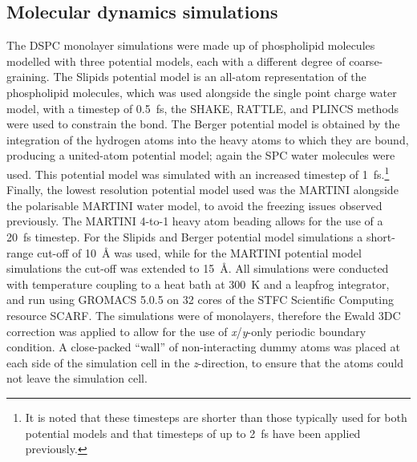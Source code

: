 \subsection{Molecular dynamics simulations}
The DSPC monolayer simulations were made up of phospholipid molecules modelled with three potential models, each with a different degree of coarse-graining.
The Slipids potential model is an all-atom representation of the phospholipid molecules, which was used alongside the single point charge water model, with a timestep of \SI{0.5}{\femto\second}, the SHAKE, RATTLE, and PLINCS methods were used to constrain the  bond.
The Berger potential model is obtained by the integration of the hydrogen atoms into the heavy atoms to which they are bound, producing a united-atom potential model; again the SPC water molecules were used.
This potential model was simulated with an increased timestep of \SI{1}{\femto\second}.\footnote{It is noted that these timesteps are shorter than those typically used for both potential models and that timesteps of up to \SI{2}{\femto\second} have been applied previously.}
Finally, the lowest resolution potential model used was the MARTINI alongside the polarisable MARTINI water model, to avoid the freezing issues observed previously.
The MARTINI 4-to-1 heavy atom beading allows for the use of a \SI{20}{\femto\second} timestep.
For the Slipids and Berger potential model simulations a short-range cut-off of \SI{10}{\angstrom} was used, while for the MARTINI potential model simulations the cut-off was extended to \SI{15}{\angstrom}.
All simulations were conducted with temperature coupling to a heat bath at \SI{300}{\kelvin} and a leapfrog integrator, and run using GROMACS 5.0.5 on \num{32} cores of the STFC Scientific Computing resource SCARF.
The simulations were of monolayers, therefore the Ewald 3DC correction was applied to allow for the use of \emph{x}/\emph{y}-only periodic boundary condition.
A close-packed ``wall'' of non-interacting dummy atoms was placed at each side of the simulation cell in the \emph{z}-direction, to ensure that the atoms could not leave the simulation cell.

